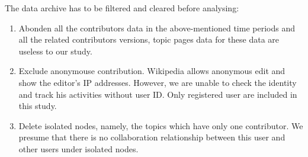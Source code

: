 \documentclass{elsarticle}
\begin{document}
The data archive has to be filtered and cleared before analysing:
\begin{enumerate}
\item Abonden all the contributors data in the above-mentioned time
  periods and all the related contributors versions, topic pages data
  for these data are useless to our study.
\item Exclude anonymouse contribution. Wikipedia allows anonymous edit
  and show the editor's IP addresses. However, we are unable to check
  the identity and track his activities without user ID. Only
  registered user are included in this study.
\item Delete isolated nodes, namely, the topics which have only one
  contributor. We presume that there is no collaboration relationship
  between this user and other users under isolated nodes.

\end{enumerate}
 
\end{document}
